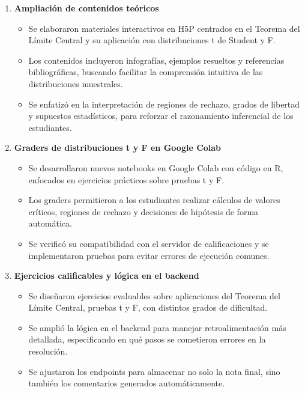 \documentclass[letter,oneside,12pt,spanish]{report}
\begin{document}
\begin{enumerate}
	\item \textbf{Ampliación de contenidos teóricos}  
	\begin{itemize}
		\item Se elaboraron materiales interactivos en H5P centrados en el Teorema del Límite Central y su aplicación con distribuciones t de Student y F.
		\item Los contenidos incluyeron infografías, ejemplos resueltos y referencias bibliográficas, buscando facilitar la comprensión intuitiva de las distribuciones muestrales.
		\item Se enfatizó en la interpretación de regiones de rechazo, grados de libertad y supuestos estadísticos, para reforzar el razonamiento inferencial de los estudiantes.
	\end{itemize}
	
	\item \textbf{Graders de distribuciones t y F en Google Colab}  
	\begin{itemize}
		\item Se desarrollaron nuevos notebooks en Google Colab con código en R, enfocados en ejercicios prácticos sobre pruebas t y F.
		\item Los graders permitieron a los estudiantes realizar cálculos de valores críticos, regiones de rechazo y decisiones de hipótesis de forma automática.
		\item Se verificó su compatibilidad con el servidor de calificaciones y se implementaron pruebas para evitar errores de ejecución comunes.
	\end{itemize}
	
	\item \textbf{Ejercicios calificables y lógica en el backend}  
	\begin{itemize}
		\item Se diseñaron ejercicios evaluables sobre aplicaciones del Teorema del Límite Central, pruebas t y F, con distintos grados de dificultad.
		\item Se amplió la lógica en el backend para manejar retroalimentación más detallada, especificando en qué pasos se cometieron errores en la resolución.
		\item Se ajustaron los endpoints para almacenar no solo la nota final, sino también los comentarios generados automáticamente.
	\end{itemize}
	

\end{enumerate}
\end{document}
